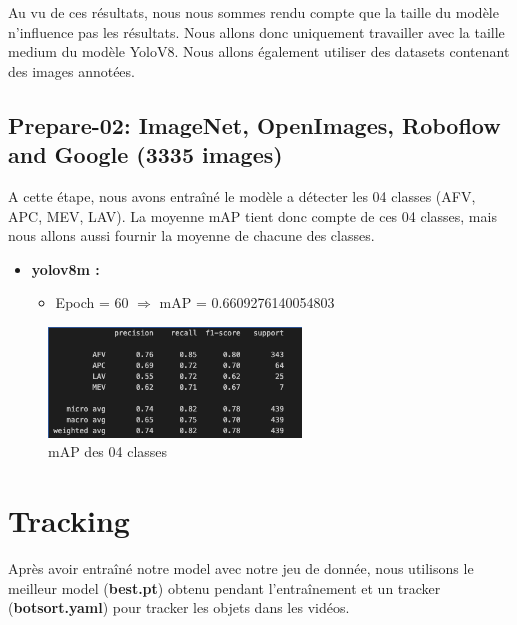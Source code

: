 Au vu de ces résultats, nous nous sommes rendu compte que la taille du modèle n'influence pas les résultats. Nous allons donc uniquement travailler avec la taille medium du modèle YoloV8.
Nous allons également utiliser des datasets contenant des images annotées.


\subsection*{Prepare-02: ImageNet, OpenImages, Roboflow and Google  (3335 images)}

A cette étape, nous avons entraîné le modèle a détecter les 04 classes (AFV, APC, MEV, LAV).
La moyenne mAP tient donc compte de ces 04 classes, mais nous allons aussi fournir la moyenne de chacune des classes.

\begin{itemize}
    \item \textbf{yolov8m :}
          \begin{itemize}
              \item Epoch = 60 $\Rightarrow$ mAP = 0.6609276140054803
          \end{itemize}
\end{itemize}

\begin{figure}[H]
    \center
    \includegraphics[width=0.6\textwidth]{./images/map-train.png}
    \caption[mAP des 04 classes]{mAP des 04 classes}\label{fig:map-train}
\end{figure}



\section{Tracking}

Après avoir entraîné notre model avec notre jeu de donnée, nous utilisons le meilleur model (\textbf{best.pt}) obtenu pendant l'entraînement et un tracker (\textbf{botsort.yaml}) pour tracker les objets dans les vidéos.



